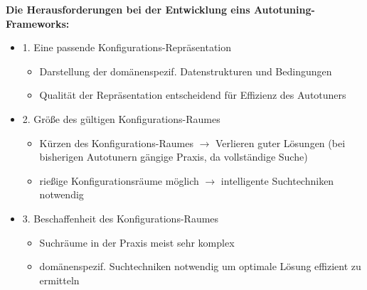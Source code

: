     \begin{frame}
    
    \textbf{Die Herausforderungen bei der Entwicklung eins Autotuning-Frameworks:}
    
    \begin{itemize}
       
    \item 1. Eine passende Konfigurations-Repräsentation
        \begin{itemize}
          \item Darstellung der domänenspezif. Datenstrukturen und Bedingungen
          \item Qualität der Repräsentation entscheidend für Effizienz des Autotuners \newline
        \end{itemize}
        
    \item 2. Größe des gültigen Konfigurations-Raumes
        \begin{itemize}
          \item Kürzen des Konfigurations-Raumes $\rightarrow$ Verlieren guter Lösungen
          (bei bisherigen Autotunern gängige Praxis, da vollständige Suche)
          \item rießige Konfigurationsräume möglich $\rightarrow$  intelligente Suchtechniken notwendig \newline
        \end{itemize}
        
    \item 3. Beschaffenheit des Konfigurations-Raumes
      \begin{itemize}
        \item Suchräume in der Praxis meist sehr komplex 
        \item domänenspezif. Suchtechniken notwendig um optimale Lösung effizient zu ermitteln
      \end{itemize}
    \end{itemize}
        
    \end{frame}
    

%     
    
